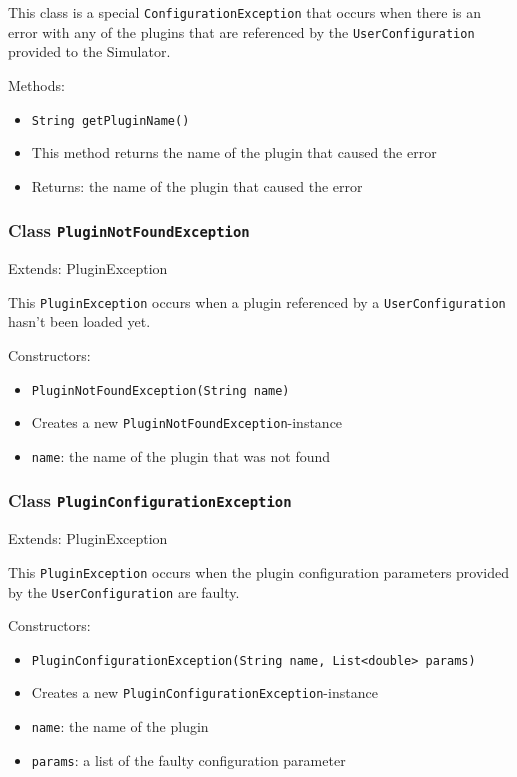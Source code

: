 \documentclass[parskip=full,11pt]{scrartcl}
\begin{document}
This class is a special \texttt{ConfigurationException} that occurs when there is an error with any of the plugins that are referenced by the \texttt{UserConfiguration} provided to the Simulator.

Methods:
\begin{itemize} \itemsep -10pt
	\item \texttt{String getPluginName()}
	\item[] This method returns the name of the plugin that caused the error
	\item[] Returns: the name of the plugin that caused the error
\end{itemize}

\subsubsection{Class \texttt{PluginNotFoundException}}
Extends: PluginException

This \texttt{PluginException} occurs when a plugin referenced by a \texttt{UserConfiguration} hasn't been loaded yet.

Constructors:
\begin{itemize} \itemsep -10pt
	\item \texttt{PluginNotFoundException(String name)}
	\item[] Creates a new \texttt{PluginNotFoundException}-instance
	\item[] \texttt{name}: the name of the plugin that was not found
\end{itemize}

\subsubsection{Class \texttt{PluginConfigurationException}}
Extends: PluginException

This \texttt{PluginException} occurs when the plugin configuration parameters provided by the \texttt{UserConfiguration} are faulty.

Constructors:
\begin{itemize}\itemsep -10pt
	\item \texttt{PluginConfigurationException(String name, List<double> params)}
	\item[] Creates a new \texttt{PluginConfigurationException}-instance
	\item[] \texttt{name}: the name of the plugin
	\item[] \texttt{params}: a list of the faulty configuration parameter
\end{itemize}
\end{document}
